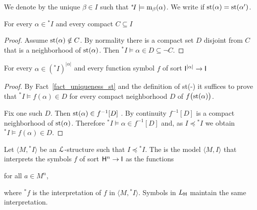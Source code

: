 \documentclass[10pt,oneside]{amsproc}
\renewcommand*{\emph}[1]{%
   \smash{\tikz[baseline]\node[rectangle, fill=teal!25, rounded corners, inner xsep=0.5ex, inner ysep=0.2ex, anchor=base, minimum height = 2.7ex]{#1};}}
\begin{document}
We denote by \emph{${\rm st}(\alpha)$\/} the unique $\beta\in I$ such that ${}^*\!I\models{\rm m}_\beta(\alpha)$.
We write \emph{$\alpha\approx\alpha'$\/} if ${\rm st}(\alpha)={\rm st}(\alpha')$.

\begin{fact}\label{fact_st1}
  For every $\alpha\in{}^*\! I$ and every compact $C\subseteq I$

\end{fact}

\begin{proof}
  Assume ${\rm st}(\alpha)\notin C$.
  By normality there is a compact set $D$ disjoint from $C$ that is a neighborhood of ${\rm st}(\alpha)$.
  Then  ${}^*\!I\models\alpha\in D\subseteq\neg C$.
\end{proof}

\begin{fact}\label{fact_terms_st}
  For every $\alpha\in({}^*\! I)^{|\alpha|}$ and every function symbol $f$ of sort ${\sf I}^{|\alpha|}\to{\sf I}$

\end{fact}

\begin{proof}
  By Fact~\ref{fact_uniqueness_st} and the definition of st(-) it suffices to prove that ${}^*\!I\models f(\alpha)\in D$ for every compact neighborhood $D$ of $f\big({\rm st}(\alpha)\big)$.
  
  Fix one such $D$.
  Then ${\rm st}(\alpha)\in f^{-1}[D]$ .
  By continuity $f^{-1}[D]$ is a compact neighborhood of ${\rm st}(\alpha)$.
  Therefore ${}^*\!I\models \alpha\in f^{-1}[D]$ and, as $I\preceq{}^*\!I$ we obtain ${}^*\!I\models f(\alpha)\in D$.
\end{proof}

Let $\langle M,{}^*\!I\rangle$ be an ${\EuScript L}$-structure such that $I\preceq{}^*\!I$.
The \emph{standard part of $\langle M,{}^*\!I\rangle$\/} is the model $\langle M,I\rangle$ that interprets the symbols $f$ of sort ${\sf H}^n\to {\sf I}$ as the functions

\hfill for all $a\in M^n$,

where ${}^*\!f$ is the interpretation of $f$ in  $\langle M,{}^*\!I\rangle$.
Symbols in $L_{\sf H}$ maintain the same interpretation.
\end{document}
